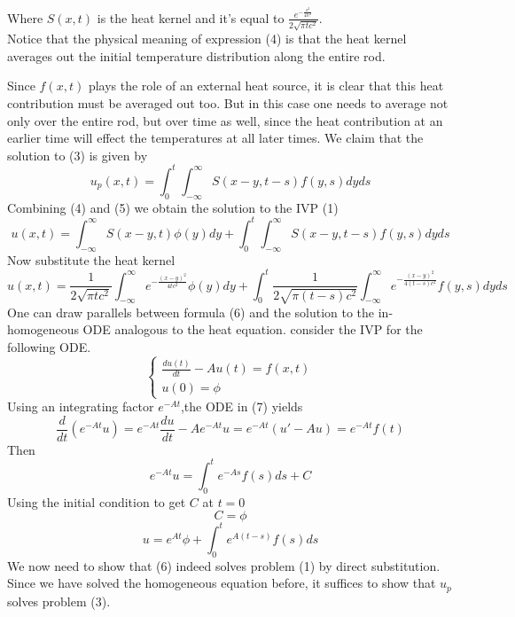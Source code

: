Where $S(x,t)$ is the heat kernel and it's equal to $\displaystyle \frac{\textstyle e^{-\frac{x^2}{4tc^2}}}{2\sqrt{\pi tc^2}}$.
\\
Notice that the physical meaning of expression (4) is that the heat
kernel averages out the initial temperature distribution along the entire rod.
\par
Since $f(x, t)$ plays the role of an external heat source, it is clear that this heat contribution must be averaged out too. 
But in this case one needs to average not only over the entire rod, but over time as well, 
since the heat contribution at an earlier time will effect the temperatures at all later times. 
We claim that the solution to (3) is given by
\begin{equation}
    u_p(x,t) = \int_{0}^{t}\int_{-\infty}^{\infty}S(x-y,t-s) f(y,s)dyds
\end{equation}
Combining (4) and (5) we obtain the solution to the IVP (1)
\begin{equation}
    u(x,t)  = \int_{-\infty}^{\infty}S(x-y,t) \phi(y)dy + \int_{0}^{t}\int_{-\infty}^{\infty}S(x-y,t-s) f(y,s)dyds
\end{equation}
Now substitute the heat kernel
\[
    u(x,t) = \frac{1}{2\sqrt{\pi tc^2}}\int_{-\infty}^{\infty}e^{\textstyle -\frac{{(x-y)}^2}{4tc^2}} \phi(y)dy + \int_{0}^{t} \frac{1}{2\sqrt{\pi (t-s)c^2}} \int_{-\infty}^{\infty}e^{\textstyle -\frac{{(x-y)}^2}{4(t-s)c^2}} f(y,s)dyds            
\]
One can draw parallels between formula (6) and the solution to the in-homogeneous ODE analogous
to the heat equation. consider the IVP for the following ODE.
\begin{equation}
    \begin{cases}
        \displaystyle \frac{du(t)}{dt} - A u(t) = f(x,t)
        \\
        u(0) = \phi
    \end{cases}
\end{equation}
Using an integrating factor $e^{-At}$,the ODE in (7) yields
\[
\frac{d}{dt}\left(e^{-At}u\right)= e^{-At} \frac{du}{dt} - Ae^{-At} u  = e^{-At}(u'-Au) = e^{-At} f(t)
\]
Then
\[
    e^{-At}u = \int_{0}^{t} e^{-As} f(s)ds + C
\]
Using the initial condition to get $C$ at $t=0$
\[
C = \phi    
\]
\[
    u = e^{At}\phi + \int_{0}^{t} e^{A(t-s)} f(s)ds
\]
We now need to show that (6) indeed solves problem (1) by direct substitution. 
\\
Since we have solved the homogeneous equation before, it suffices to show that $u_p$ solves problem (3). 
\par
